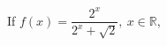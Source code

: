 \documentclass[preview]{standalone}
\begin{document}
\begin{center}
If $f(x) = \dfrac{2^x}{2^x + \sqrt{2}},\ x \in \mathbb{R}$,
\end{center}
\end{document}
